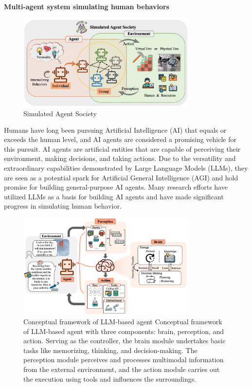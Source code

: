 \textbf{Multi-agent system simulating human behaviors}\quad
\begin{figure}
    \centering
    \includegraphics[width=0.8\textwidth]{image/figure12.jpg}
    \caption{Simulated Agent Society\cite{xi_rise_2023}}
  \label{fig:agent_society}
\end{figure}
Humans have long been pursuing Artificial Intelligence (AI) that equals or exceeds the human level, and AI agents are considered a promising vehicle for this pursuit. 
AI agents are artificial entities that are capable of perceiving their environment, making decisions, and taking actions. 
Due to the versatility and extraordinary capabilities demonstrated by Large Language Models (LLMs), they are seen as a potential spark for Artificial General Intelligence (AGI) and hold promise for building general-purpose AI agents\cite{xi_rise_2023}. 
Many research efforts have utilized LLMs as a basis for building AI agents and have made significant progress in simulating human behavior.
\begin{figure}
    \centering
    \includegraphics[width=0.8\textwidth]{image/figure2.jpg}
    \caption{Conceptual framework of LLM-based agent Conceptual framework of LLM-based agent with three components: brain, perception, and action. Serving as the controller, the brain module undertakes basic tasks like memorizing, thinking, and decision-making. The perception module perceives and processes multimodal information from the external environment, and the action module carries out the execution using tools and influences the surroundings.\cite{xi_rise_2023}}
  \label{fig:agent_conceptual_framework}
\end{figure}
